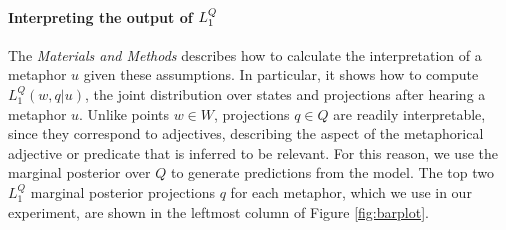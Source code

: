 \documentclass[9pt,twocolumn,twoside,lineno]{pnas-new}
\newcommand{\Listener}{L}
\newcommand{\QLONE}{\Listener_{{1}}^{{Q}}}
\begin{document}


\paragraph{Interpreting the output of $\protect\QLONE$}

	The \emph{Materials and Methods} describes how to calculate the interpretation of a metaphor $u$ given these assumptions. In particular, it shows how to compute $\QLONE(w,q|u)$, the joint distribution over states and projections after hearing a metaphor $u$. Unlike points $w\in W$, projections $q\in Q$ are readily interpretable, since they correspond to adjectives, describing the aspect of the metaphorical adjective or predicate that is inferred to be relevant.
	For this reason, we use the marginal posterior over $Q$ to generate predictions from the model. The top two $\QLONE$ marginal posterior projections $q$ for each metaphor, which we use in our experiment, are shown in the leftmost column of Figure \ref{fig:barplot}. 

\end{document}
